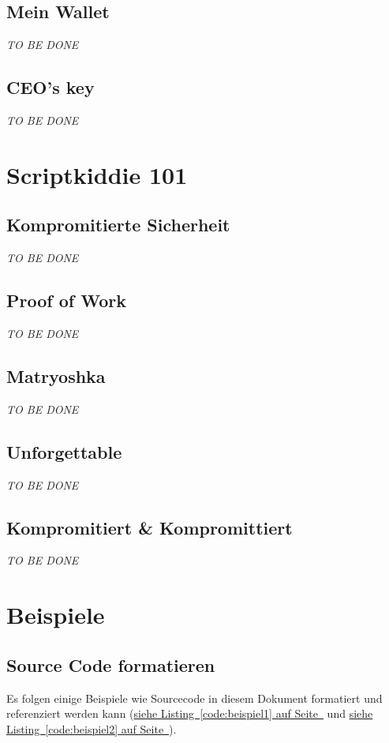 \documentclass[12pt,a4paper,titlepage,oneside]{scrartcl}
\begin{document}
\subsection{Mein Wallet}
\emph{TO BE DONE}

\subsection{CEO's key}
\emph{TO BE DONE}

\section{Scriptkiddie 101}

\subsection{Kompromitierte Sicherheit}
\emph{TO BE DONE}

\subsection{Proof of Work}
\emph{TO BE DONE}

\subsection{Matryoshka}
\emph{TO BE DONE}

\subsection{Unforgettable}
\emph{TO BE DONE}

\subsection{Kompromitiert \& Kompromittiert}
\emph{TO BE DONE}

\section{Beispiele}

\subsection{Source Code formatieren}
Es folgen einige Beispiele wie Sourcecode in diesem Dokument formatiert und referenziert werden kann
(\hyperref[code:beispiel1]{siehe Listing~\ref*{code:beispiel1} auf Seite~\pageref*{code:beispiel1}} und \hyperref[code:beispiel2]{siehe Listing~\ref*{code:beispiel2} auf Seite~\pageref*{code:beispiel2}}).
\end{document}
